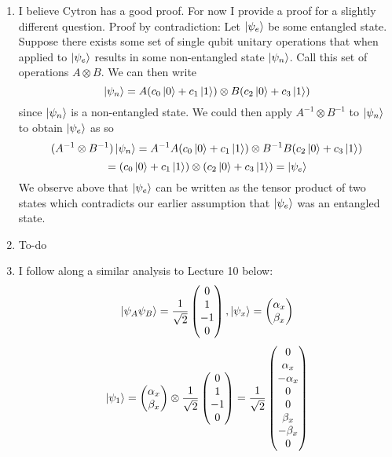 \documentclass[12pt]{article}
\begin{document}
\begin{enumerate}[font=\bfseries]
    \item I believe Cytron has a good proof. For now I provide a proof for a slightly different question. Proof by contradiction: Let $\ket{\psi_e}$ be some entangled state. Suppose there exists some set of single qubit unitary operations that when applied to $\ket{\psi_e}$ results in some non-entangled state $\ket{\psi_n}$. Call this set of operations $A \otimes B$. We can then write
    \[\ket{\psi_n} = A(c_0\ket{0}+c_1\ket{1}) \otimes B(c_2\ket{0}+c_3\ket{1})\]
    since $\ket{\psi_n}$ is a non-entangled state. We could then apply $A^{-1} \otimes B^{-1}$ to $\ket{\psi_n}$ to obtain $\ket{\psi_e}$ as so
    \[(A^{-1} \otimes B^{-1})\ket{\psi_n} = A^{-1}A(c_0\ket{0}+c_1\ket{1}) \otimes B^{-1}B(c_2\ket{0}+c_3\ket{1})\]
    \[= (c_0\ket{0}+c_1\ket{1}) \otimes (c_2\ket{0}+c_3\ket{1}) = \ket{\psi_e}\]
    We observe above that $\ket{\psi_e}$ can be written as the tensor product of two states which contradicts our earlier assumption that $\ket{\psi_e}$ was an entangled state.
    \item To-do
    \item I follow along a similar analysis to Lecture 10 below:
    \[\ket{\psi_A\psi_B} = 
    \frac{1}{\sqrt{2}}
    \begin{pmatrix}
    0 \\ 1 \\ -1 \\ 0
    \end{pmatrix}
    ,
    \ket{\psi_x} = 
    \begin{pmatrix}
    \alpha_x \\ \beta_x
    \end{pmatrix}
    \]
    \[
    \ket{\psi_1} = \begin{pmatrix}
    \alpha_x \\ \beta_x
    \end{pmatrix}
    \otimes
    \frac{1}{\sqrt{2}}
    \begin{pmatrix}
    0 \\ 1 \\ -1 \\ 0
    \end{pmatrix}
    =
    \frac{1}{\sqrt{2}}
    \begin{pmatrix}
    0 \\ \alpha_x \\ -\alpha_x \\ 0 \\
    0 \\ \beta_x \\ -\beta_x \\ 0

\end{pmatrix}\]
\end{enumerate}
\end{document}
